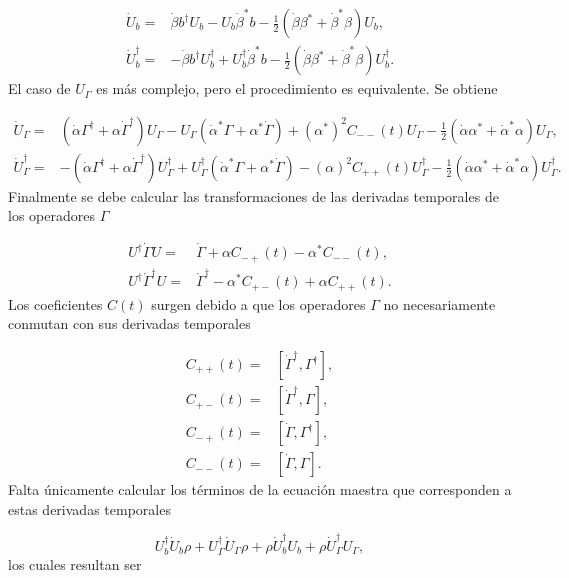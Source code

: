 \documentclass[10pt,a4paper]{report}
\begin{document}
\begin{align}
\dot{U}_b=&\dot{\beta} b^\dagger U_b - U_b\dot{\beta}^*b - \frac{1}{2}(\dot{\beta} \beta^*+\dot{\beta}^* \beta)U_b,\\
\dot{U}_b^\dagger=&-\dot{\beta} b^\dagger U_b^\dagger + U_b^\dagger\dot{\beta}^*b - \frac{1}{2}(\dot{\beta} \beta^*+\dot{\beta}^* \beta)U_b^\dagger.
\end{align} El caso de $U_\Gamma$ es más complejo, pero el procedimiento es equivalente. Se obtiene

\begin{align}
\dot{U}_\Gamma =&(\dot{\alpha}\Gamma^\dagger +\alpha \dot{\Gamma}^\dagger)U_\Gamma - U_\Gamma(\dot{\alpha}^*\Gamma+\alpha^* \dot{\Gamma}) + (\alpha^*)^2 C_{--}(t)U_\Gamma-\frac{1}{2}(\dot{\alpha} \alpha^*+\dot{\alpha}^* \alpha)U_\Gamma, \\
\dot{U}^\dagger_\Gamma=&-(\dot{\alpha}\Gamma^\dagger +\alpha \dot{\Gamma}^\dagger)U_\Gamma^\dagger + U_\Gamma^\dagger(\dot{\alpha}^*\Gamma+\alpha^* \dot{\Gamma}) - (\alpha)^2 C_{++}(t)U_\Gamma^\dagger-\frac{1}{2}(\dot{\alpha} \alpha^*+\dot{\alpha}^* \alpha)U_\Gamma^\dagger.
\end{align} Finalmente se debe calcular las transformaciones de las derivadas temporales de los operadores $\Gamma$

\begin{align}
U^{\dagger}\dot{\Gamma}U =& \dot{\Gamma} + \alpha C_{-+}(t) -\alpha^* C_{--}(t),\\
U^{\dagger}\dot{\Gamma}^\dagger U =& \dot{\Gamma}^\dagger - \alpha^* C_{+-}(t) +\alpha C_{++}(t). 
\end{align} Los coeficientes $C(t)$ surgen debido a que los operadores $\Gamma$ no necesariamente conmutan con sus derivadas temporales

\begin{align*}
C_{++}(t) =& [\dot{\Gamma}^{\dagger}, \Gamma^{\dagger}],\\
C_{+-}(t) =& [\dot{\Gamma}^{\dagger}, \Gamma],\\
C_{-+}(t) =& [\dot{\Gamma}, \Gamma^{\dagger}],\\
C_{--}(t) =& [\dot{\Gamma}, \Gamma].
\end{align*} Falta únicamente calcular los términos de la ecuación maestra que corresponden a estas derivadas temporales

\begin{equation}
U_b^\dagger \dot{U}_b \rho + U_\Gamma^\dagger \dot{U}_\Gamma \rho + \rho \dot{U}_b^\dagger U_b+ \rho \dot{U}_\Gamma^\dagger U_\Gamma,
\end{equation} los cuales resultan ser
\end{document}
